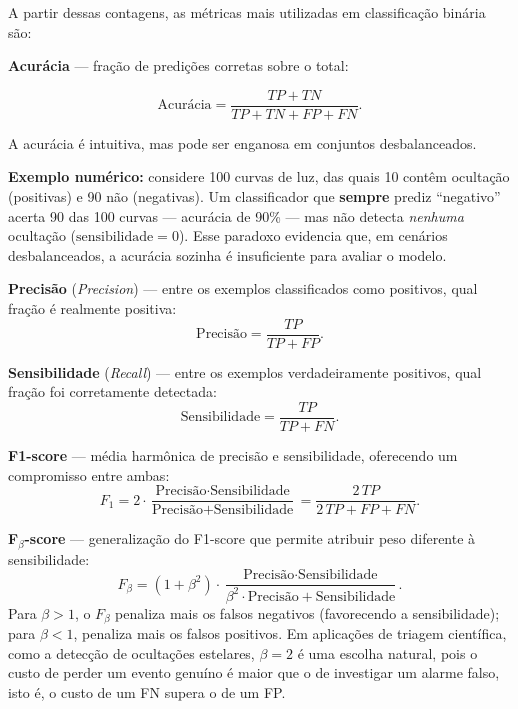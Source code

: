 A partir dessas contagens, as métricas mais utilizadas em classificação binária são:

\textbf{Acurácia} --- fração de predições corretas sobre o total:

\begin{equation}
\text{Acurácia} = \frac{TP + TN}{TP + TN + FP + FN}.
\end{equation}

A acurácia é intuitiva, mas pode ser enganosa em conjuntos desbalanceados. 

\textbf{Exemplo numérico:} considere 100 curvas de luz, das quais 10 contêm ocultação (positivas) e 90 não (negativas). Um classificador que \textbf{sempre} prediz ``negativo'' acerta 90 das 100 curvas --- acurácia de 90\% --- mas não detecta \textit{nenhuma} ocultação ($\text{sensibilidade} = 0$). Esse paradoxo evidencia que, em cenários desbalanceados, a acurácia sozinha é insuficiente para avaliar o modelo.

\textbf{Precisão} (\textit{Precision}) --- entre os exemplos classificados como positivos, qual fração é realmente positiva:
\begin{equation}
\text{Precisão} = \frac{TP}{TP + FP}.
\end{equation}

\textbf{Sensibilidade} (\textit{Recall}) --- entre os exemplos verdadeiramente positivos, qual fração foi corretamente detectada:
\begin{equation}
\text{Sensibilidade} = \frac{TP}{TP + FN}.
\end{equation}

\textbf{F1-score} --- média harmônica de precisão e sensibilidade, oferecendo um compromisso entre ambas:
\begin{equation}
F_1 = 2 \cdot \frac{\text{Precisão} \cdot \text{Sensibilidade}}{\text{Precisão} + \text{Sensibilidade}} = \frac{2\,TP}{2\,TP + FP + FN}.
\end{equation}

\textbf{F$_\beta$-score} --- generalização do F1-score que permite atribuir peso diferente à sensibilidade:
\begin{equation}
F_\beta = (1 + \beta^2) \cdot \frac{\text{Precisão} \cdot \text{Sensibilidade}}{\beta^2 \cdot \text{Precisão} + \text{Sensibilidade}}.
\end{equation}
Para $\beta > 1$, o $F_\beta$ penaliza mais os falsos negativos (favorecendo a sensibilidade); para $\beta < 1$, penaliza mais os falsos positivos. Em aplicações de triagem científica, como a detecção de ocultações estelares, $\beta = 2$ é uma escolha natural, pois o custo de perder um evento genuíno é maior que o de investigar um alarme falso, isto é, o custo de um FN supera o de um FP.

